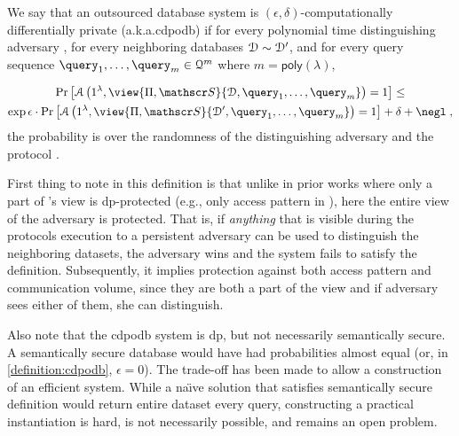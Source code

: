 			\begin{definition}\label{definition:cdpodb}
				We say that an outsourced database system \protocol{} is $(\epsilon, \delta)$-computationally differentially private (a.k.a.\acrshort{cdpodb}) if for every polynomial time distinguishing adversary \adversary{}, for every neighboring databases $\mathcal{D} \sim \mathcal{D}^\prime$, and for every query sequence $\fromNtoM{\query}{1}{m} \in \querySet^m$ where $m = \mathsf{poly}(\lambda)$,

				\begin{multline*}
					\probability{\adversary \left( 1^\lambda, \view{\protocol, \server}{\database, \fromNtoM{\query}{1}{m}} \right) = 1 } \leq \\
					\exp{\epsilon} \cdot \probability{\adversary \left( 1^\lambda, \view{\protocol ,\server}{\database^\prime, \fromNtoM{\query}{1}{m}} \right) = 1} + \delta + \negl \; ,
				\end{multline*}
				the probability is over the randomness of the distinguishing adversary \adversary{} and the protocol \protocol{}.
			\end{definition}

			First thing to note in this definition is that unlike in prior works where only a part of \adversary{}'s view is \acrshort{dp}-protected (e.g., only access pattern in \cite{differential-obliviousness,differential-obliviousness-followup}), here the entire view of the adversary is protected.
			That is, if \emph{anything} that is visible during the protocols execution to a persistent adversary can be used to distinguish the neighboring datasets, the adversary wins and the system fails to satisfy the definition.
			Subsequently, it implies protection against both access pattern and communication volume, since they are both a part of the view and if adversary sees either of them, she can distinguish.

			Also note that the \acrshort{cdpodb} system is \acrshort{dp}, but not necessarily semantically secure.
			A semantically secure database would have had probabilities almost equal (or, in \cref{definition:cdpodb}, $\epsilon = 0$).
			The trade-off has been made to allow a construction of an efficient system.
			While a na\"{\i}ve solution that satisfies semantically secure definition would return entire dataset every query, constructing a practical instantiation is hard, is not necessarily possible, and remains an open problem.

